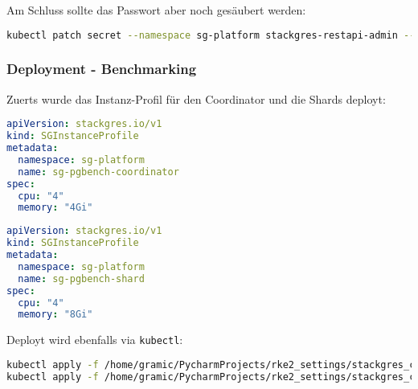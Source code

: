 Am Schluss sollte das Passwort aber noch gesäubert werden:
\lstset{style=gra_codestyle}
\begin{lstlisting}[language=bash, caption=StackGres-Citus - System Passwort Cleanup,captionpos=b,label={lst:stackgres_citus-system-password-cleanup},breaklines=true]
kubectl patch secret --namespace sg-platform stackgres-restapi-admin --type json -p '[{"op":"remove","path":"/data/clearPassword"}]'
\end{lstlisting}

\subsubsection{Deployment - Benchmarking}
Zuerts wurde das Instanz-Profil für den Coordinator und die Shards deployt:
\lstset{style=gra_codestyle}
\begin{lstlisting}[language=yaml, caption=StackGres-Citus - Benchmarking - SGInstanceProfile Coordinator,captionpos=b,label={lst:SGInstanceProfile_pgbench_coord.yaml},breaklines=true]
apiVersion: stackgres.io/v1
kind: SGInstanceProfile
metadata:
  namespace: sg-platform
  name: sg-pgbench-coordinator
spec:
  cpu: "4"
  memory: "4Gi"
\end{lstlisting}
\lstset{style=gra_codestyle}
\begin{lstlisting}[language=yaml, caption=StackGres-Citus - Benchmarking - SGInstanceProfile Shard,captionpos=b,label={lst:SGInstanceProfile_pgbench_shard.yaml},breaklines=true]
apiVersion: stackgres.io/v1
kind: SGInstanceProfile
metadata:
  namespace: sg-platform
  name: sg-pgbench-shard
spec:
  cpu: "4"
  memory: "8Gi"
\end{lstlisting}

Deployt wird ebenfalls via \texttt{kubectl}:
\lstset{style=gra_codestyle}
\begin{lstlisting}[language=bash, caption=StackGres-Citus - Benchmarking - Instanz-Profil Deploy,captionpos=b,label={lst:stackgres_citus-deploy-benchmarking-instance-profiles},breaklines=true]
kubectl apply -f /home/gramic/PycharmProjects/rke2_settings/stackgres_citus/stackgres_citus/SGInstanceProfile_pgbench_coord.yaml
kubectl apply -f /home/gramic/PycharmProjects/rke2_settings/stackgres_citus/stackgres_citus/SGInstanceProfile_pgbench_shard.yaml
\end{lstlisting}


